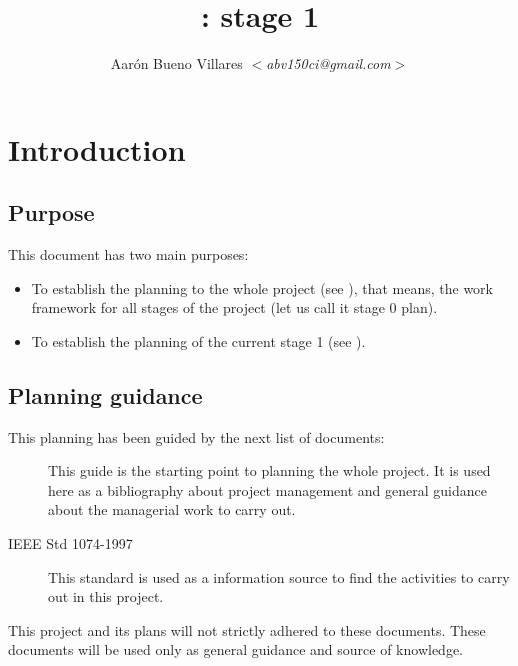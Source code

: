\documentclass[twocolumn]{article}
\title{\fav: \favpl stage 1}
\author{Aarón Bueno Villares \textit{$<$abv150ci@gmail.com$>$}}
\begin{document}
\twocolumn[
  \maketitle
]

\tableofcontents

\section{Introduction}
\subsection{Purpose}
This document has two main purposes:

\begin{itemize}
\item To establish the planning to the whole project (see
  ), that means, the work framework for all
  stages of the project (let us call it stage 0 plan).
\item To establish the planning of the current stage 1 (see
  ).
\end{itemize}

\subsection{Planning guidance}
This planning has been guided by the next list of documents:

\begin{description}
  \item[\pmbok] This guide is the starting point to planning the
    whole project. It is used here as a bibliography about project
    management and general guidance about the managerial work to carry
    out.
  \item[IEEE Std 1074-1997] This standard is used as a information
    source to find the activities to carry out in this project.
\end{description}

This project and its plans will not strictly adhered to these
documents. These documents will be used only as general guidance and
source of knowledge.

\end{document}

